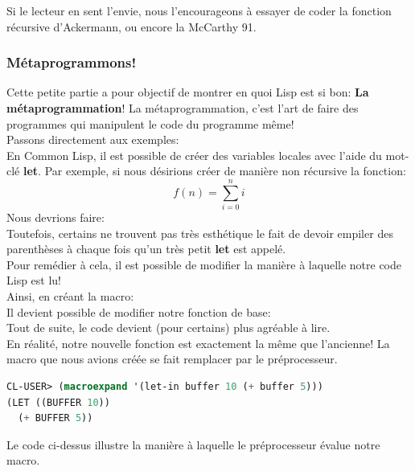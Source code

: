 \documentclass[a4paper, 12pt]{article}
\numberwithin{equation}{subsection}
\begin{document}

Si le lecteur en sent l'envie, nous l'encourageons à essayer de coder la fonction récursive d'Ackermann, ou encore la McCarthy 91. \\
\subsubsection{Métaprogrammons!}
Cette petite partie a pour objectif de montrer en quoi Lisp est si bon: {\bf La métaprogrammation}!
La métaprogrammation, c'est l'art de faire des programmes qui manipulent le code du programme même!\\

Passons directement aux exemples:\\

En Common Lisp, il est possible de créer des variables locales avec l'aide du mot-clé {\bf let}. Par exemple, si nous désirions créer de manière non récursive la fonction: \\

$$f(n) = \sum_{i=0}^{n}i$$
Nous devrions faire: \\

Toutefois, certains ne trouvent pas très esthétique le fait de devoir empiler des parenthèses à chaque fois qu'un très petit {\bf let} est appelé. \\

Pour remédier à cela, il est possible de modifier la manière à laquelle notre code Lisp est lu! \\

Ainsi, en créant la macro: \\

Il devient possible de modifier notre fonction de base: \\

Tout de suite, le code devient (pour certains) plus agréable à lire.\\

En réalité, notre nouvelle fonction est exactement la même que l'ancienne! La macro que nous avions créée se fait remplacer par le préprocesseur.
\begin{lstlisting}[language=Lisp]
CL-USER> (macroexpand '(let-in buffer 10 (+ buffer 5)))
(LET ((BUFFER 10))
  (+ BUFFER 5))
\end{lstlisting}
Le code ci-dessus illustre la manière à laquelle le préprocesseur évalue notre macro.\\
\end{document}
